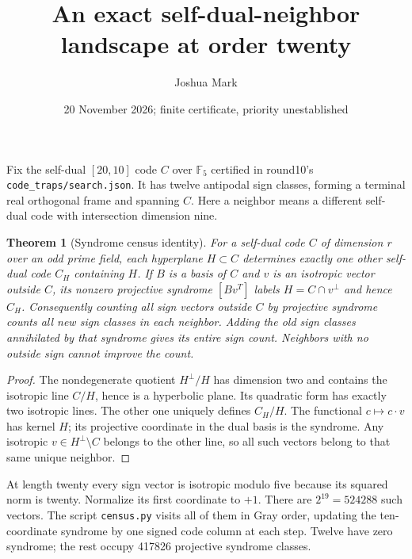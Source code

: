 \documentclass[11pt]{article}
\title{An exact self-dual-neighbor landscape at order twenty}
\author{Joshua Mark}
\date{20 November 2026; finite certificate, priority unestablished}
\newtheorem{theorem}{Theorem}
\begin{document}
\maketitle
Fix the self-dual $[20,10]$ code $C$ over $\mathbb F_5$ certified in
round10's \texttt{code\_traps/search.json}. It has twelve antipodal
sign classes, forming a terminal real orthogonal frame and spanning
$C$. Here a neighbor means a different self-dual code with
intersection dimension nine.

\begin{theorem}[Syndrome census identity]
For a self-dual code $C$ of dimension $r$ over an odd prime field,
each hyperplane $H\subset C$ determines exactly one other self-dual
code $C_H$ containing $H$. If $B$ is a basis of $C$ and $v$ is an
isotropic vector outside $C$, its nonzero projective syndrome
$[Bv^T]$ labels $H=C\cap v^\perp$ and hence $C_H$.
Consequently counting all sign vectors outside $C$ by projective
syndrome counts all new sign classes in each neighbor. Adding the
old sign classes annihilated by that syndrome gives its entire
sign count. Neighbors with no outside sign cannot improve the count.
\end{theorem}
\begin{proof}
The nondegenerate quotient $H^\perp/H$ has dimension two and contains
the isotropic line $C/H$, hence is a hyperbolic plane. Its quadratic
form has exactly two isotropic lines. The other one uniquely defines
$C_H/H$. The functional $c\mapsto c\cdot v$ has kernel $H$;
its projective coordinate in the dual basis is the syndrome.
Any isotropic $v\in H^\perp\setminus C$ belongs to the other line,
so all such vectors belong to that same unique neighbor.
\end{proof}
At length twenty every sign vector is isotropic modulo five because
its squared norm is twenty. Normalize its first coordinate to $+1$.
There are $2^{19}=524288$ such vectors. The script \texttt{census.py}
visits all of them in Gray order, updating the ten-coordinate
syndrome by one signed code column at each step. Twelve have zero
syndrome; the rest occupy 417826 projective syndrome classes.
\end{document}
